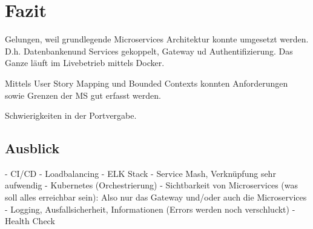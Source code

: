 \section{Fazit}
Gelungen, weil grundlegende Microservices Architektur konnte umgesetzt werden. D.h. Datenbankenund Services gekoppelt, Gateway ud Authentifizierung. Das Ganze läuft im Livebetrieb mittels Docker. 

Mittels User Story Mapping und Bounded Contexts konnten Anforderungen sowie Grenzen der MS gut erfasst werden.

Schwierigkeiten in der Portvergabe.

\subsection{Ausblick}
- CI/CD 
- Loadbalancing
- ELK Stack
- Service Mash, Verknüpfung sehr aufwendig
- Kubernetes (Orchestrierung)
- Sichtbarkeit von Microservices (was soll alles erreichbar sein): Also nur das Gateway und/oder auch die Microservices
- Logging, Ausfallsicherheit, Informationen (Errors werden noch verschluckt)
- Health Check